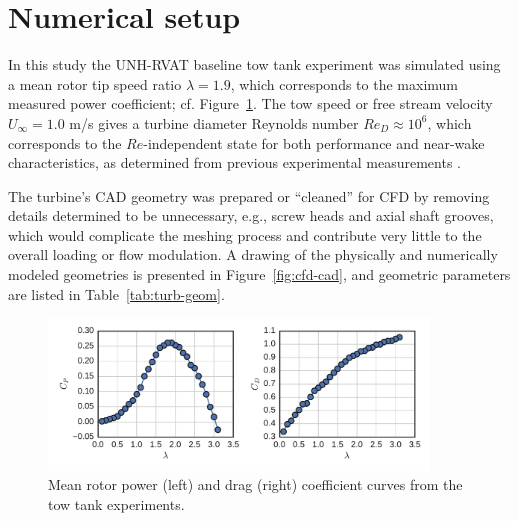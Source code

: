 \documentclass[aip,graphicx]{revtex4-1}
\begin{document}
\section{Numerical setup}

In this study the UNH-RVAT baseline tow tank experiment was simulated using a
mean rotor tip speed ratio $\lambda=1.9$, which corresponds to the maximum
measured power coefficient; cf. Figure~\ref{fig:exp-perf}. The tow speed or free
stream velocity $U_\infty=1.0$ m/s gives a turbine diameter Reynolds number
$Re_D \approx 10^6$, which corresponds to the $Re$-independent state for both
performance and near-wake characteristics, as determined from previous
experimental measurements \cite{Bachant2014, Bachant2016-Energies}.

The turbine's CAD geometry was prepared or ``cleaned'' for CFD by removing
details determined to be unnecessary, e.g., screw heads and axial shaft grooves,
which would complicate the meshing process and contribute very little to the
overall loading or flow modulation. A drawing of the physically and numerically
modeled geometries is presented in Figure~\ref{fig:cfd-cad}, and geometric
parameters are listed in Table~\ref{tab:turb-geom}.

\begin{figure}
    \centering

    \includegraphics[width=0.9\textwidth]{figures/exp_perf}

    \caption{Mean rotor power (left) and drag (right) coefficient curves from
        the tow tank experiments\cite{Bachant2016-RVAT-Re-dep}.}

    \label{fig:exp-perf}
\end{figure}
\end{document}
